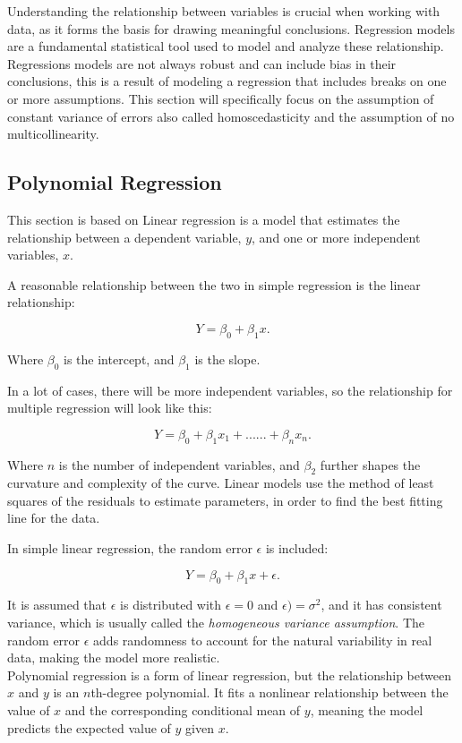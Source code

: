 Understanding the relationship between variables is crucial when working with data, as it forms the basis for drawing meaningful conclusions. Regression models are a fundamental statistical tool used to model and analyze these relationship. Regressions models are not always robust and can include bias in their conclusions, this is a result of modeling a regression that includes breaks on one or more assumptions. This section will specifically focus on the assumption of constant variance of errors also called homoscedasticity and the assumption of no multicollinearity.
\subsection*{Polynomial Regression}
This section is based on 
Linear regression is a model that estimates the relationship between a dependent variable, \( y \), and one or more independent variables, \( x \).

\noindent A reasonable relationship between the two in simple regression is the linear relationship:

\[
Y = \beta_0 + \beta_1 x .
\]

\noindent Where \( \beta_0 \) is the intercept, and \( \beta_1 \) is the slope.

\noindent In a lot of cases, there will be more independent variables, so the relationship for multiple regression will look like this:

\[
Y = \beta_0 + \beta_1 x_1 + ......+ \beta_n x_n .
\]



\noindent Where \( n \) is the number of independent variables, and $\beta_2$ further shapes the curvature and complexity of the curve. Linear models use the method of least squares of the residuals to estimate parameters, in order to find the best fitting line for the data.

\noindent In simple linear regression, the random error \( \epsilon \) is included:

\[
Y = \beta_0 + \beta_1 x + \epsilon .
\]

\noindent It is assumed that \( \epsilon \) is distributed with $\epsilon = 0$ and $\epsilon) = \sigma^2$, and it has consistent variance, which is usually called the \textit{homogeneous variance assumption}. The random error \( \epsilon \) adds randomness to account for the natural variability in real data, making the model more realistic.
\newline\\
Polynomial regression is a form of linear regression, but the relationship between \( x \) and \( y \) is an \( n \)th-degree polynomial. It fits a nonlinear relationship between the value of \( x \) and the corresponding conditional mean of \( y \), meaning the model predicts the expected value of \( y \) given \( x \). \newline

